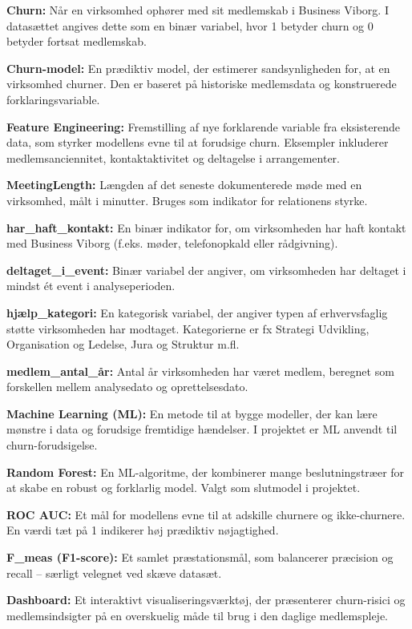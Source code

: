 \documentclass[
  11pt,
  letterpaper,
  DIV=11,
  numbers=noendperiod]{scrartcl}
\begin{document}
\textbf{Churn:} Når en virksomhed ophører med sit medlemskab i Business
Viborg. I datasættet angives dette som en binær variabel, hvor 1 betyder
churn og 0 betyder fortsat medlemskab.

\textbf{Churn-model:} En prædiktiv model, der estimerer sandsynligheden
for, at en virksomhed churner. Den er baseret på historiske medlemsdata
og konstruerede forklaringsvariable.

\textbf{Feature Engineering:} Fremstilling af nye forklarende variable
fra eksisterende data, som styrker modellens evne til at forudsige
churn. Eksempler inkluderer medlemsanciennitet, kontaktaktivitet og
deltagelse i arrangementer.

\textbf{MeetingLength:} Længden af det seneste dokumenterede møde med en
virksomhed, målt i minutter. Bruges som indikator for relationens
styrke.

\textbf{har\_haft\_kontakt:} En binær indikator for, om virksomheden har
haft kontakt med Business Viborg (f.eks. møder, telefonopkald eller
rådgivning).

\textbf{deltaget\_i\_event:} Binær variabel der angiver, om virksomheden
har deltaget i mindst ét event i analyseperioden.

\textbf{hjælp\_kategori:} En kategorisk variabel, der angiver typen af
erhvervsfaglig støtte virksomheden har modtaget. Kategorierne er fx
Strategi Udvikling, Organisation og Ledelse, Jura og Struktur m.fl.

\textbf{medlem\_antal\_år:} Antal år virksomheden har været medlem,
beregnet som forskellen mellem analysedato og oprettelsesdato.

\textbf{Machine Learning (ML):} En metode til at bygge modeller, der kan
lære mønstre i data og forudsige fremtidige hændelser. I projektet er ML
anvendt til churn-forudsigelse.

\textbf{Random Forest:} En ML-algoritme, der kombinerer mange
beslutningstræer for at skabe en robust og forklarlig model. Valgt som
slutmodel i projektet.

\textbf{ROC AUC:} Et mål for modellens evne til at adskille churnere og
ikke-churnere. En værdi tæt på 1 indikerer høj prædiktiv nøjagtighed.

\textbf{F\_meas (F1-score):} Et samlet præstationsmål, som balancerer
præcision og recall -- særligt velegnet ved skæve datasæt.

\textbf{Dashboard:} Et interaktivt visualiseringsværktøj, der
præsenterer churn-risici og medlemsindsigter på en overskuelig måde til
brug i den daglige medlemspleje.
\end{document}
